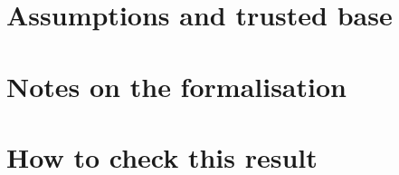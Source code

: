 \section{Assumptions and trusted base}

\section{Notes on the formalisation}

\section{How to check this result}

